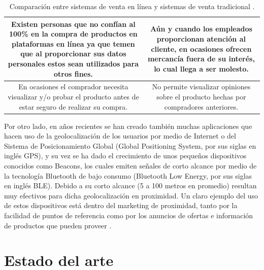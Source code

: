 \begin{table}[htb]
\begin{tabularx}{\textwidth}{|C|C|}
Existen personas que no confían al 100\% en la compra de productos en plataformas en línea ya que temen que al proporcionar sus datos personales estos sean utilizados para otros fines.
&
Aún y cuando los empleados proporcionan atención al cliente, en ocasiones ofrecen mercancía fuera de su interés, lo cual llega a ser molesto.
\\ \hline

En ocasiones el comprador necesita visualizar y/o probar el producto antes de estar seguro de realizar su compra. 
&
No permite visualizar opiniones sobre el producto hechas por compradores anteriores. 
\\ \hline

\end{tabularx}
\caption{Comparación entre sistemas de venta en línea y sistemas de venta tradicional \cite{Sistemasventa}\cite{NextU}.}
\label{table:comparacion}
\end{table}
\FloatBarrier


Por otro lado, en años recientes se han creado también muchas aplicaciones que hacen uso de la geolocalización de los usuarios por medio de Internet o del Sistema de Posicionamiento Global (Global Positioning System, por sus siglas en inglés GPS), y su vez se ha dado el crecimiento de unos pequeños dispositivos conocidos como Beacons, los cuales emiten señales de corto alcance por medio de la tecnología Bluetooth de bajo consumo (Bluetooth Low Energy, por sus siglas en inglés BLE). Debido a su corto alcance (5 a 100 metros en promedio) resultan muy efectivos para dicha geolocalización en proximidad. Un claro ejemplo del uso de estos dispositivos está dentro del marketing de proximidad, tanto por la facilidad de puntos de referencia como por los anuncios de ofertas e información de productos que pueden proveer \cite{nicolas}. 


\section{Estado del arte}

